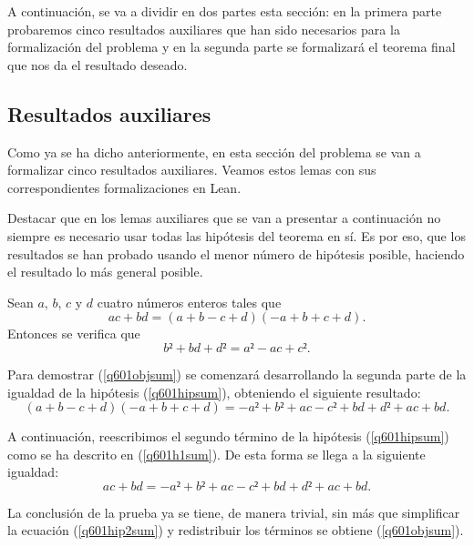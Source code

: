 A continuación, se va a dividir en dos partes esta sección: en la
primera parte probaremos cinco resultados auxiliares que han sido
necesarios para la formalización del problema y en la segunda parte se
formalizará el teorema final que nos da el resultado deseado.

\subsection{Resultados auxiliares}

Como ya se ha dicho anteriormente, en esta sección del problema se van a
formalizar cinco resultados auxiliares. Veamos estos lemas con sus
correspondientes formalizaciones en Lean.

Destacar que en los lemas auxiliares que se van a presentar a
continuación no siempre es necesario usar todas las hipótesis del
teorema en sí. Es por eso, que los resultados se han probado usando el
menor número de hipótesis posible, haciendo el resultado lo más general
posible.

\begin{lema}\label{q601lemasuma}
  Sean \(a\), \(b\), \(c\) y \(d\) cuatro números enteros tales que
  \begin{equation}\label{q601hipsum}\tag{h}
    ac+bd = (a+b-c+d)(-a+b+c+d).
  \end{equation}
  Entonces se verifica que
  \begin{equation}\label{q601objsum}
    b²+bd+d² = a²-ac+c².
  \end{equation}
\end{lema}

\begin{demostracion}
  Para demostrar (\ref{q601objsum}) se comenzará desarrollando la
  segunda parte de la igualdad de la hipótesis (\ref{q601hipsum}),
  obteniendo el siguiente resultado:
  \begin{equation}\tag{h1}\label{q601h1sum}
    (a+b-c+d)(-a+b+c+d) = -a²+b²+ac-c²+bd+d²+ac+bd.
  \end{equation}

  A continuación, reescribimos el segundo término de la hipótesis
  (\ref{q601hipsum}) como se ha descrito en (\ref{q601h1sum}). De esta
  forma se llega a la siguiente igualdad:
  \begin{equation}\label{q601hip2sum}
    ac+bd = -a²+b²+ac-c²+bd+d²+ac+bd.
  \end{equation}

  La conclusión de la prueba ya se tiene, de manera trivial, sin más que
  simplificar la ecuación (\ref{q601hip2sum}) y redistribuir los
  términos se obtiene (\ref{q601objsum}).
\end{demostracion}

